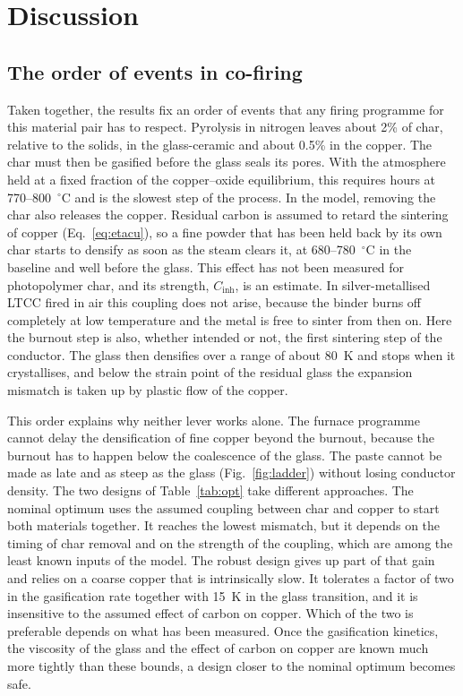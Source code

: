 \section{Discussion}
\label{sec:discussion}

\subsection{The order of events in co-firing}

Taken together, the results fix an order of events that any firing programme for this material pair has to respect. Pyrolysis in nitrogen leaves about 2\% of char, relative to the solids, in the glass-ceramic and about 0.5\% in the copper. The char must then be gasified before the glass seals its pores. With the atmosphere held at a fixed fraction of the copper--oxide equilibrium, this requires hours at 770--800~$^\circ$C and is the slowest step of the process. In the model, removing the char also releases the copper. Residual carbon is assumed to retard the sintering of copper (Eq.~\eqref{eq:etacu}), so a fine powder that has been held back by its own char starts to densify as soon as the steam clears it, at 680--780~$^\circ$C in the baseline and well before the glass. This effect has not been measured for photopolymer char, and its strength, $C_{\mathrm{inh}}$, is an estimate. In silver-metallised LTCC fired in air this coupling does not arise, because the binder burns off completely at low temperature and the metal is free to sinter from then on. Here the burnout step is also, whether intended or not, the first sintering step of the conductor. The glass then densifies over a range of about 80~K and stops when it crystallises, and below the strain point of the residual glass the expansion mismatch is taken up by plastic flow of the copper.

This order explains why neither lever works alone. The furnace programme cannot delay the densification of fine copper beyond the burnout, because the burnout has to happen below the coalescence of the glass. The paste cannot be made as late and as steep as the glass (Fig.~\ref{fig:ladder}) without losing conductor density. The two designs of Table~\ref{tab:opt} take different approaches. The nominal optimum uses the assumed coupling between char and copper to start both materials together. It reaches the lowest mismatch, but it depends on the timing of char removal and on the strength of the coupling, which are among the least known inputs of the model. The robust design gives up part of that gain and relies on a coarse copper that is intrinsically slow. It tolerates a factor of two in the gasification rate together with 15~K in the glass transition, and it is insensitive to the assumed effect of carbon on copper. Which of the two is preferable depends on what has been measured. Once the gasification kinetics, the viscosity of the glass and the effect of carbon on copper are known much more tightly than these bounds, a design closer to the nominal optimum becomes safe.

